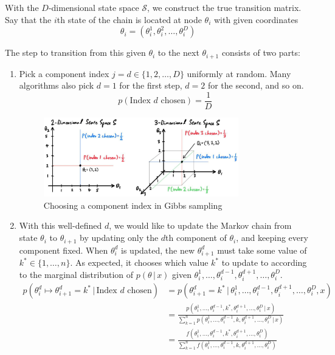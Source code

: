 \documentclass{article}
\begin{document}
  With the $D$-dimensional state space $\mathcal{S}$, we construct the true transition matrix. Say that the $i$th state of the chain is located at node $\theta_i$ with given coordinates
  \begin{equation}
    \theta_i = (\theta_i^1, \theta_i^2, \ldots, \theta_i^D)
  \end{equation}

  The step to transition from this given $\theta_i$ to the next $\theta_{i+1}$ consists of two parts:
  \begin{enumerate}
    \item Pick a component index $j=d \in \{1, 2, \ldots, D\}$ uniformly at random. Many algorithms also pick $d=1$ for the first step, $d=2$ for the second, and so on.
    \begin{equation}
      p(\text{Index }d \text{ chosen}) = \frac{1}{D}
    \end{equation}
    
    \begin{figure}[H]
      \centering
      \includegraphics[width=0.8\textwidth]{img/choose_index.jpg}
      \caption{Choosing a component index in Gibbs sampling}
    \end{figure}

    \item With this well-defined $d$, we would like to update the Markov chain from state $\theta_i$ to $\theta_{i+1}$ by updating only the $d$th component of $\theta_i$, and keeping every component fixed. When $\theta_i^d$ is updated, the new $\theta_{i+1}^d$ must take some value of $k^* \in \{1, \ldots, n\}$. As expected, it chooses which value $k^*$ to update to according to the marginal distribution of $p(\theta\,|\,x)$ given $\theta_i^1, \ldots, \theta_i^{d-1}, \theta_i^{d+1}, \ldots, \theta_i^D$.
    \begin{align*}
      p(\theta_i^d \mapsto \theta_{i+1}^d = k^*\,|\, \text{Index } d \text{ chosen}) & = p(\theta_{i+1}^d = k^* \,|\,\theta_i^1, \ldots, \theta_i^{d-1}, \theta_i^{d+1}, \ldots, \theta_i^D, x) \\
      & = \frac{p(\theta_i^1, \ldots, \theta_i^{d-1}, k^*, \theta_i^{d+1}, \ldots, \theta_i^D\,|\,x)}{\sum_{k=1}^n p(\theta_i^1, \ldots, \theta_i^{d-1}, k, \theta_i^{d+1}, \ldots, \theta_i^D\,|\,x)} \\
      & = \frac{f(\theta_i^1, \ldots, \theta_i^{d-1}, k^*, \theta_i^{d+1}, \ldots, \theta_i^D)}{\sum_{k=1}^n f(\theta_i^1, \ldots, \theta_i^{d-1}, k, \theta_i^{d+1}, \ldots, \theta_i^D)}
    \end{align*}


\end{enumerate}
\end{document}
